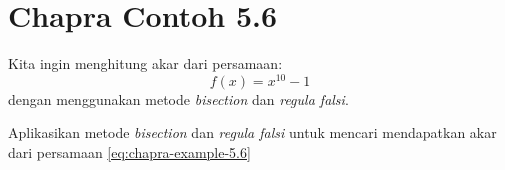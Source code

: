 \section{Chapra Contoh 5.6}

Kita ingin menghitung akar dari persamaan:
\begin{equation}
f(x) = x^{10} - 1
\label{eq:chapra-example-5.6}
\end{equation}
dengan menggunakan metode \textit{bisection} dan \textit{regula falsi}.

\begin{soal}
Aplikasikan metode \textit{bisection} dan \textit{regula falsi} untuk mencari mendapatkan
akar dari persamaan \eqref{eq:chapra-example-5.6}
\end{soal}